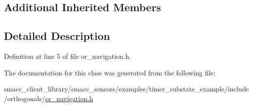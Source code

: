 \subsection*{Additional Inherited Members}


\subsection{Detailed Description}


Definition at line 5 of file or\+\_\+navigation.\+h.



The documentation for this class was generated from the following file\+:\begin{DoxyCompactItemize}
\item 
smacc\+\_\+client\+\_\+library/smacc\+\_\+sensors/examples/timer\+\_\+substate\+\_\+example/include/orthogonals/\hyperlink{smacc__client__library_2smacc__sensors_2examples_2timer__substate__example_2include_2orthogonals_2or__navigation_8h}{or\+\_\+navigation.\+h}\end{DoxyCompactItemize}

